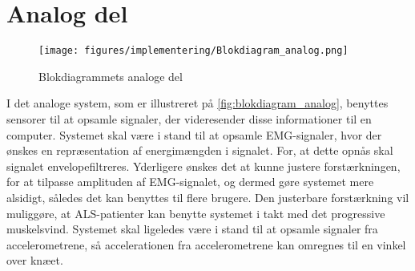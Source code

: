 \section{Analog del} \label{sec:analog_del_krav}
\begin{figure}[H]
\centering
\texttt{[image: figures/implementering/Blokdiagram\_analog.png]}
\caption{Blokdiagrammets analoge del}
\label{fig:blokdiagram_analog}
\end{figure}

\noindent
I det analoge system, som er illustreret på \autoref{fig:blokdiagram_analog}, benyttes sensorer til at opsamle signaler, der videresender disse informationer til en computer. Systemet skal være i stand til at opsamle EMG-signaler, hvor der ønskes en repræsentation af energimængden i signalet. For, at dette opnås skal signalet envelopefiltreres. Yderligere ønskes det at kunne justere forstærkningen, for at tilpasse amplituden af EMG-signalet, og dermed gøre systemet mere alsidigt, således det kan benyttes til flere brugere. Den justerbare forstærkning vil muliggøre, at ALS-patienter kan benytte systemet i takt med det progressive muskelsvind.
Systemet skal ligeledes være i stand til at opsamle signaler fra accelerometrene, så accelerationen fra accelerometrene kan omregnes til en vinkel over knæet.
